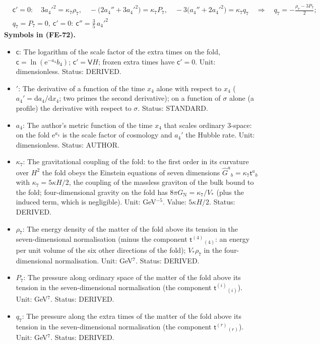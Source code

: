 \documentclass[
  10pt,
]{article}
\providecommand{\tightlist}{%
  \setlength{\itemsep}{0pt}\setlength{\parskip}{0pt}}
\begin{document}
\[
\begin{aligned}
&\mathsf{c}' = 0:\quad 3a_4'^2 = \kappa_7\rho_7,\quad -\big(2a_4'' + 3a_4'^2\big) = \kappa_7P_7,\quad
 -3\big(a_4'' + 2a_4'^2\big) = \kappa_7q_7\quad\Rightarrow\quad q_7 = -\frac{\rho_7 - 3P_7}{2};\\
&q_7 = P_7 = 0,\ \mathsf{c}' = 0:\ \mathsf{c}'' = \frac35\,a_4'^2
\end{aligned} \tag{FE-72}
\] \textbf{Symbols in (FE-72).}

\begin{itemize}
\tightlist
\item
  \(\mathsf{c}\): The logarithm of the scale factor of the extra times
  on the fold, \(\mathsf{c} = \ln(\mathrm{e}^{-a_4}b_4)\);
  \(\mathsf{c}' = \mathsf{V}H\); frozen extra times have
  \(\mathsf{c}' = 0\). Unit: dimensionless. Status: DERIVED.
\item
  \({}'\): The derivative of a function of the time \(x_4\) alone with
  respect to \(x_4\) (\(a_4' = \mathrm{d}a_4/\mathrm{d}x_4\); two primes
  the second derivative); on a function of \(\sigma\) alone (a profile)
  the derivative with respect to \(\sigma\). Status: STANDARD.
\item
  \(a_4\): The author's metric function of the time \(x_4\) that scales
  ordinary 3-space: on the fold \(\mathrm{e}^{a_4}\) is the scale factor
  of cosmology and \(a_4'\) the Hubble rate. Unit: dimensionless.
  Status: AUTHOR.
\item
  \(\kappa_7\): The gravitational coupling of the fold: to the first
  order in its curvature over \(H^2\) the fold obeys the Einstein
  equations of seven dimensions
  \(\hat G^a{}_b = \kappa_7\mathsf{t}^a{}_b\) with
  \(\kappa_7 = 5\kappa H/2\), the coupling of the massless graviton of
  the bulk bound to the fold; four-dimensional gravity on the fold has
  \(8\pi G_{\mathrm{N}} = \kappa_7/V_*\) (plus the induced term, which
  is negligible). Unit: GeV\(^{-5}\). Value: \(5\kappa H/2\). Status:
  DERIVED.
\item
  \(\rho_7\): The energy density of the matter of the fold above its
  tension in the seven-dimensional normalisation (minus the component
  \(\mathsf{t}^{(4)}{}_{(4)}\): an energy per unit volume of the six
  other directions of the fold); \(V_*\rho_7\) in the four-dimensional
  normalisation. Unit: GeV\(^7\). Status: DERIVED.
\item
  \(P_7\): The pressure along ordinary space of the matter of the fold
  above its tension in the seven-dimensional normalisation (the
  component \(\mathsf{t}^{(i)}{}_{(i)}\)). Unit: GeV\(^7\). Status:
  DERIVED.
\item
  \(q_7\): The pressure along the extra times of the matter of the fold
  above its tension in the seven-dimensional normalisation (the
  component \(\mathsf{t}^{(r)}{}_{(r)}\)). Unit: GeV\(^7\). Status:
  DERIVED.
\end{itemize}
\end{document}
